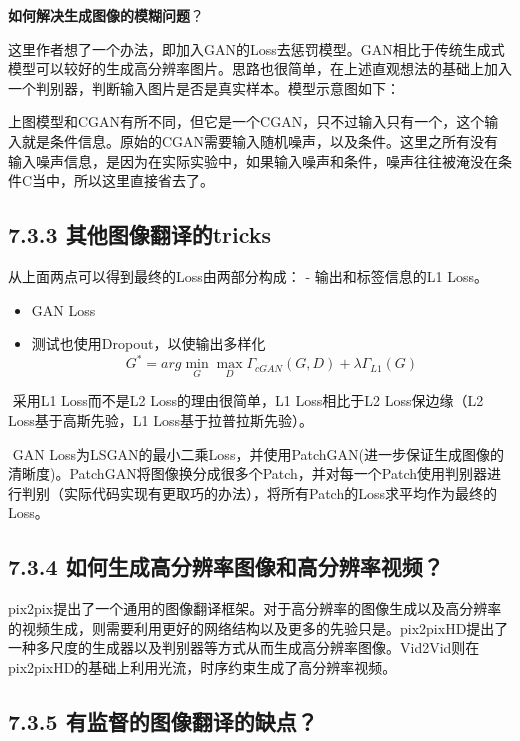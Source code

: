 \textbf{如何解决生成图像的模糊问题}？

​
这里作者想了一个办法，即加入GAN的Loss去惩罚模型。GAN相比于传统生成式模型可以较好的生成高分辨率图片。思路也很简单，在上述直观想法的基础上加入一个判别器，判断输入图片是否是真实样本。模型示意图如下：

​
上图模型和CGAN有所不同，但它是一个CGAN，只不过输入只有一个，这个输入就是条件信息。原始的CGAN需要输入随机噪声，以及条件。这里之所有没有输入噪声信息，是因为在实际实验中，如果输入噪声和条件，噪声往往被淹没在条件C当中，所以这里直接省去了。

\subsection{7.3.3
其他图像翻译的tricks}\label{ux5176ux4ed6ux56feux50cfux7ffbux8bd1ux7684tricks}

从上面两点可以得到最终的Loss由两部分构成： - 输出和标签信息的L1 Loss。

\begin{itemize}
\item
  GAN Loss
\item
  测试也使用Dropout，以使输出多样化 \[
    G^*=arg\mathop {\min }\limits_G \mathop {\max }\limits_D \Gamma_{cGAN}(G,D)+\lambda\Gamma_{L1}(G)
    \]
\end{itemize}

​ 采用L1 Loss而不是L2 Loss的理由很简单，L1 Loss相比于L2 Loss保边缘（L2
Loss基于高斯先验，L1 Loss基于拉普拉斯先验）。

​ GAN
Loss为LSGAN的最小二乘Loss，并使用PatchGAN(进一步保证生成图像的清晰度)。PatchGAN将图像换分成很多个Patch，并对每一个Patch使用判别器进行判别（实际代码实现有更取巧的办法），将所有Patch的Loss求平均作为最终的Loss。

\subsection{7.3.4
如何生成高分辨率图像和高分辨率视频？}\label{ux5982ux4f55ux751fux6210ux9ad8ux5206ux8fa8ux7387ux56feux50cfux548cux9ad8ux5206ux8fa8ux7387ux89c6ux9891}

​
pix2pix提出了一个通用的图像翻译框架。对于高分辨率的图像生成以及高分辨率的视频生成，则需要利用更好的网络结构以及更多的先验只是。pix2pixHD提出了一种多尺度的生成器以及判别器等方式从而生成高分辨率图像。Vid2Vid则在pix2pixHD的基础上利用光流，时序约束生成了高分辨率视频。

\subsection{7.3.5
有监督的图像翻译的缺点？}\label{ux6709ux76d1ux7763ux7684ux56feux50cfux7ffbux8bd1ux7684ux7f3aux70b9}

